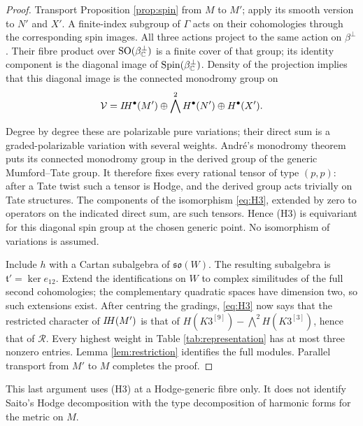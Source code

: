 \begin{proof}
Transport Proposition \ref{prop:spin} from $M$ to $M'$;
apply its smooth version to $N'$ and $X'$. A finite-index
subgroup of $\Gamma$ acts on their cohomologies through
the corresponding spin images. All three actions project
to the same action on $\beta^\perp$. Their fibre product
over $\operatorname{SO}(\beta^\perp_{\mathbb C})$ is a finite cover of that
group; its identity component is the diagonal image of
$\operatorname{Spin}(\beta^\perp_{\mathbb C})$. Density of
the projection implies that this diagonal image is the
connected monodromy group on
\[
 \mathcal V=I\!H^\bullet(M')\oplus
           \bigwedge^2H^\bullet(N')\oplus H^\bullet(X').
\]

Degree by degree these are polarizable pure variations; their
direct sum is a graded-polarizable variation with several
weights. Andr\'e's monodromy theorem
\cite[Lemma~4, Theorem~1]{andre92} puts its connected monodromy
group in the derived group of the generic Mumford--Tate group.
It therefore fixes every rational tensor of type $(p,p)$:
after a Tate twist such a tensor is Hodge, and the derived
group acts trivially on Tate structures. The components of
the isomorphism \eqref{eq:H3}, extended by zero to operators
on the indicated direct sum, are such tensors. Hence (H3)
is equivariant for this diagonal spin group at the chosen
generic point. No isomorphism of variations is assumed.

Include $h$ with a Cartan subalgebra of $\mathfrak{so}(W)$.
The resulting subalgebra is $\mathfrak t'=\ker e_{12}$.
Extend the identifications on $W$ to complex similitudes of
the full second cohomologies; the complementary quadratic
spaces have dimension two, so such extensions exist.
After centring the gradings, \eqref{eq:H3} now says that
the restricted character of $I\!H(M')$ is that of
$H(K3^{[9]})-\bigwedge^2H(K3^{[3]})$, hence that of
$\mathcal R$. Every highest weight in Table
\ref{tab:representation} has at most three nonzero entries.
Lemma \ref{lem:restriction} identifies the full modules.
Parallel transport from $M'$ to $M$ completes the proof.
\end{proof}

This last argument uses (H3) at a Hodge-generic fibre only.
It does not identify Saito's Hodge decomposition with the
type decomposition of harmonic forms for the metric on $M$.
